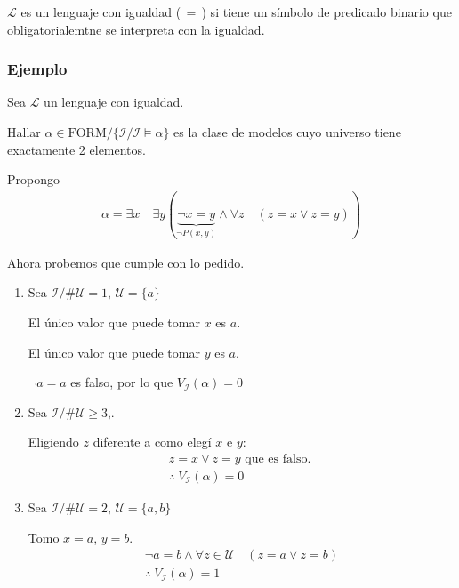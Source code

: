 \begin{definicion}{}{}
    $\mathcal{L}$ es un lenguaje con igualdad ($\,=\,$) si tiene un símbolo
    de predicado binario que obligatorialemtne se interpreta con la igualdad.
\end{definicion}

\subsubsection{Ejemplo}

Sea $\mathcal{L}$ un lenguaje con igualdad.

Hallar 
$\alpha \in \mathrm{FORM} / \{ \mathcal{I} / \mathcal{I} \vDash \alpha \}$
es la clase de modelos cuyo universo tiene exactamente 2 elementos.

Propongo
\begin{gather*}
    \alpha = \exists x \quad \exists y ( \underbrace{\neg x = y}_{\neg P(x,y)}
    \wedge \forall z \quad (z = x \vee z = y)) 
\end{gather*}

Ahora probemos que cumple con lo pedido.
\begin{enumerate}
    \item Sea $\mathcal{I} / \# \mathcal{U} = 1$, $\mathcal{U} = \{ a \}$

        El único valor que puede tomar $x$ es $a$.

        El único valor que puede tomar $y$ es $a$.
        \begin{center}
            $\neg a = a$ es falso, por lo que $V_{\mathcal{I}}(\alpha) = 0$
        \end{center}

    \item Sea $\mathcal{I} / \# \mathcal{U} \geq 3$,.

        Eligiendo $z$ diferente a como elegí $x$ e $y$:
        \begin{gather*}
            z = x \vee z = y \text{ que es falso. }\\ 
            \therefore ~ V_{\mathcal{I}} (\alpha) = 0
        \end{gather*}

    \item Sea $\mathcal{I}/ \# \mathcal{U} = 2$, $\mathcal{U} = \{ a,b \}$

        Tomo $x = a$, $y = b$.
        \begin{gather*}
            \neg a = b \wedge \forall z \in \mathcal{U} \quad (z=a \vee z=b) \\
            \therefore ~ V_{\mathcal{I}} (\alpha) =  1
        \end{gather*}
\end{enumerate}

